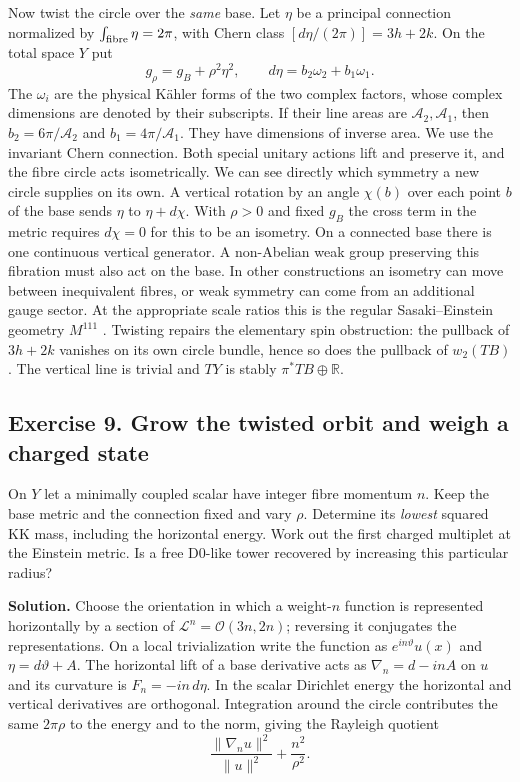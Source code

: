 \documentclass[10pt]{article}
\begin{document}
Now twist the circle over the \emph{same} base. Let $\eta$ be a principal connection normalized by $\int_{\rm fibre}\eta=2\pi$, with Chern class $[d\eta/(2\pi)]=3h+2k$. On the total space $Y$ put
\begin{equation}
 g_\rho=g_B+\rho^2\eta^2,\qquad
 d\eta=b_2\omega_2+b_1\omega_1 .
 \label{eq:connectionmetric}
\end{equation}
The $\omega_i$ are the physical K\"ahler forms of the two complex factors, whose complex dimensions are denoted by their subscripts. If their line areas are $\mathcal A_2,\mathcal A_1$, then $b_2=6\pi/\mathcal A_2$ and $b_1=4\pi/\mathcal A_1$. They have dimensions of inverse area. We use the invariant Chern connection. Both special unitary actions lift and preserve it, and the fibre circle acts isometrically. We can see directly which symmetry a new circle supplies on its own. A vertical rotation by an angle $\chi(b)$ over each point $b$ of the base sends $\eta$ to $\eta+d\chi$. With $\rho>0$ and fixed $g_B$ the cross term in the metric requires $d\chi=0$ for this to be an isometry. On a connected base there is one continuous vertical generator. A non-Abelian weak group preserving this fibration must also act on the base. In other constructions an isometry can move between inequivalent fibres, or weak symmetry can come from an additional gauge sector. At the appropriate scale ratios this is the regular Sasaki--Einstein geometry $M^{111}$ \cite{Fabbri1999,SevenMTheory2026}. Twisting repairs the elementary spin obstruction: the pullback of $3h+2k$ vanishes on its own circle bundle, hence so does the pullback of $w_2(TB)$. The vertical line is trivial and $TY$ is stably $\pi^*TB\oplus\mathbb R$.

\subsection{Exercise 9. Grow the twisted orbit and weigh a charged state}
On $Y$ let a minimally coupled scalar have integer fibre momentum $n$. Keep the base metric and the connection fixed and vary $\rho$. Determine its \emph{lowest} squared KK mass, including the horizontal energy. Work out the first charged multiplet at the Einstein metric. Is a free D0-like tower recovered by increasing this particular radius?

\noindent\textbf{Solution.}
Choose the orientation in which a weight-$n$ function is represented horizontally by a section of $\mathcal L^n=\mathcal O(3n,2n)$; reversing it conjugates the representations. On a local trivialization write the function as $e^{in\vartheta}u(x)$ and $\eta=d\vartheta+A$. The horizontal lift of a base derivative acts as $\nabla_n=d-inA$ on $u$ and its curvature is $F_n=-in\,d\eta$. In the scalar Dirichlet energy the horizontal and vertical derivatives are orthogonal. Integration around the circle contributes the same $2\pi\rho$ to the energy and to the norm, giving the Rayleigh quotient
\begin{equation}
 \frac{\|\nabla_n u\|^2}{\|u\|^2}+\frac{n^2}{\rho^2}.
\end{equation}
\end{document}
